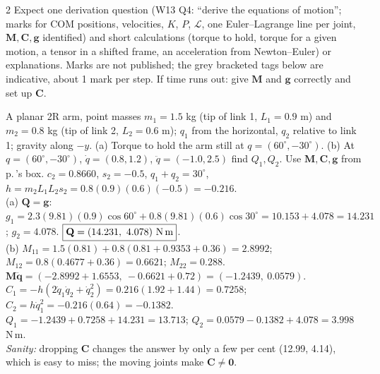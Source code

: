 \begin{multicols}{2}
Expect one derivation question (W13 Q4: ``derive the equations of motion''; marks for COM positions, velocities, $K$, $P$, $\mathcal L$, one Euler--Lagrange line per joint, $\mathbf M,\mathbf C,\mathbf g$ identified) and short calculations (torque to hold, torque for a given motion, a tensor in a shifted frame, an acceleration from Newton--Euler) or explanations. Marks are not published; the grey bracketed tags below are indicative, about 1 mark per step. If time runs out: give $\mathbf M$ and $\mathbf g$ correctly and set up $\mathbf C$.

\begin{examq}
A planar 2R arm, point masses $m_1=1.5$ kg (tip of link 1, $L_1=0.9$ m) and $m_2=0.8$ kg (tip of link 2, $L_2=0.6$ m); $q_1$ from the horizontal, $q_2$ relative to link 1; gravity along $-y$. (a) Torque to hold the arm still at $q=(60^\circ,-30^\circ)$. (b) At $q=(60^\circ,-30^\circ)$, $\dot q=(0.8,1.2)$, $\ddot q=(-1.0,2.5)$ find $Q_1,Q_2$.
\solution
Use $\mathbf M,\mathbf C,\mathbf g$ from p.\,\pageref{w7:scenarios}'s box. $c_2=0.8660$, $s_2=-0.5$, $q_1+q_2=30^\circ$, $h=m_2L_1L_2s_2=0.8(0.9)(0.6)(-0.5)=-0.216$.\\
(a) $\mathbf Q=\mathbf g$: $g_1=2.3(9.81)(0.9)\cos60^\circ+0.8(9.81)(0.6)\cos30^\circ=10.153+4.078=14.231$; $g_2=4.078$. $\boxed{\mathbf Q=(14.231,\ 4.078)\text{ N\,m}}$.\\
(b) $M_{11}=1.5(0.81)+0.8(0.81+0.9353+0.36)=2.8992$; $M_{12}=0.8(0.4677+0.36)=0.6621$; $M_{22}=0.288$. $\mathbf M\ddot{\mathbf q}=(-2.8992+1.6553,\ -0.6621+0.72)=(-1.2439,\ 0.0579)$.\\
$C_1=-h(2\dot q_1\dot q_2+\dot q_2^2)=0.216(1.92+1.44)=0.7258$; $C_2=h\dot q_1^2=-0.216(0.64)=-0.1382$.\\
$Q_1=-1.2439+0.7258+14.231=\boxed{13.713}$; $Q_2=0.0579-0.1382+4.078=\boxed{3.998}$ N\,m. \chk\\
\emph{Sanity:} dropping $\mathbf C$ changes the answer by only a few per cent (12.99, 4.14), which is easy to miss; the moving joints make $\mathbf C\neq\mathbf 0$.
\end{examq}


\end{multicols}
